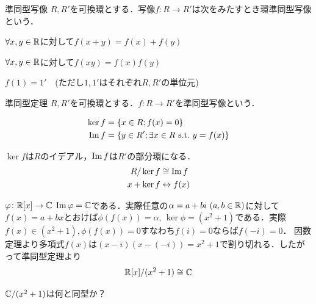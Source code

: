 \documentclass[dvipdfmx, leqno]{jsreport}
\begin{document}
\begin{soudef}{準同型写像}
    $R, R'$を可換環とする．写像$f\colon R\to R'$は次をみたすとき環準同型写像という．
\begin{enumerate_roman}
    \item $\forall x, y\in \mathbb{R}$に対して$f(x+ y)= f(x)+ f(y)$
    \item $\forall x, y\in \mathbb{R}$に対して$f(xy)= f(x)f(y)$
    \item $f(1)= 1'$\ \ (ただし$1, 1'$はそれぞれ$R, R'$の単位元)
\end{enumerate_roman}
\end{soudef}

\begin{southm}{準同型定理}
    $R, R'$を可換環とする．$f\colon R\to R'$を準同型写像という．
\end{southm}
\begin{sounotation}
\begin{align*}
    \ker{f}&= \{x\in R; f(x)= 0\}\\
    \operatorname{Im}{f}&= \{y\in R'; \exists x\in R\ \mathrm{s.t.}\  y= f(x)\} 
\end{align*}
\end{sounotation}
\begin{souremark}
    $\ker{f}$は$R$のイデアル，$\operatorname{Im}{f}$は$R'$の部分環になる．
\begin{align*}
    R\slash \ker{f}&\cong \operatorname{Im}{f}\\
    x+ \ker{f}&\leftrightarrow f(x)
\end{align*}
\end{souremark}


\begin{souexample}
\begin{center}
\end{center}
    $\varphi\colon \mathbb{R}[x]\to \mathbb{C}$  
    $\operatorname{Im}{\varphi}= \mathbb{C}$である．実際任意の$\alpha= a+ bi\ (a, b\in \mathbb{R})$に対して$f(x)= a+ bx$とおけば$\phi(f(x))= \alpha$, $\ker{\phi}= (x^2+ 1)$である．実際$f(x)\in (x^2+ 1), \phi(f(x))= 0$すなわち$f(i)= 0$ならば$f(-i)= 0$．
    因数定理より多項式$f(x)$は$(x- i)(x- (-i))= x^2+ 1$で割り切れる．したがって準同型定理より
\begin{equation*}
    \mathbb{R}[x]\slash (x^2+ 1)\cong \mathbb{C}
\end{equation*}
\end{souexample}
\begin{souquiz}
    $\mathbb{C}\slash (x^2+ 1)$は何と同型か？
\end{souquiz}
\end{document}

